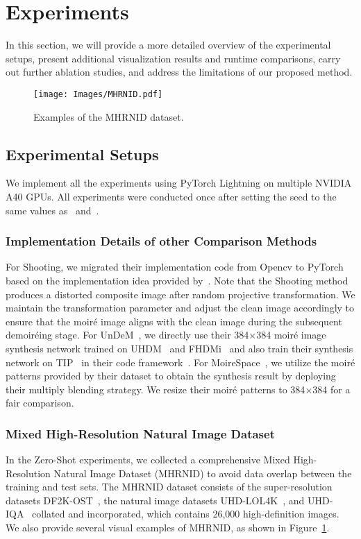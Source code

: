 \section{Experiments}
\label{sec:sup_esperiments}
In this section, we will provide a more detailed overview of the experimental setups, present additional visualization results and runtime comparisons, carry out further ablation studies, and address the limitations of our proposed method.

\begin{figure}[!t]
  \centering
    \texttt{[image: Images/MHRNID.pdf]}
  \caption{Examples of the MHRNID dataset.} 
  \label{fig:mhrnid}
\end{figure}

\subsection{Experimental Setups}
We implement all the experiments using PyTorch Lightning on multiple NVIDIA A40 GPUs. All experiments were conducted once after setting the seed to the same values as~\cite{yu2022towards} and~\cite{undem}.

\subsubsection{Implementation Details of other Comparison Methods}
For Shooting, we migrated their implementation code from Opencv to PyTorch based on the implementation idea provided by~\cite{shooting}. Note that the Shooting method produces a distorted composite image after random projective transformation. We maintain the transformation parameter and adjust the clean image accordingly to ensure that the moiré image aligns with the clean image during the subsequent demoiréing stage.
For UnDeM~\cite{undem}, we directly use their 384$\times$384 moiré image synthesis network trained on UHDM~\cite{yu2022towards} and FHDMi~\cite{he2020fhde} and also train their synthesis network on TIP~\cite{sun2018moire} in their code framework~\cite{undem}.
For MoireSpace~\cite{yang2023doing}, we utilize the moiré patterns provided by their dataset to obtain the synthesis result by deploying their multiply blending strategy. We resize their moiré patterns to 384$\times$384 for a fair comparison.



\subsubsection{Mixed High-Resolution Natural Image Dataset}
In the Zero-Shot experiments, we collected a comprehensive Mixed High-Resolution Natural Image Dataset (MHRNID) to avoid data overlap between the training and test sets. The MHRNID dataset consists of the super-resolution datasets DF2K-OST~\cite{wang2021real}, the natural image datasets UHD-LOL4K~\cite{wang2023uhdlol4k}, and UHD-IQA~\cite{hosu2024uhdiqa} collated and incorporated, which contains 26,000 high-definition images. We also provide several visual examples of MHRNID, as shown in Figure~\ref{fig:mhrnid}.

